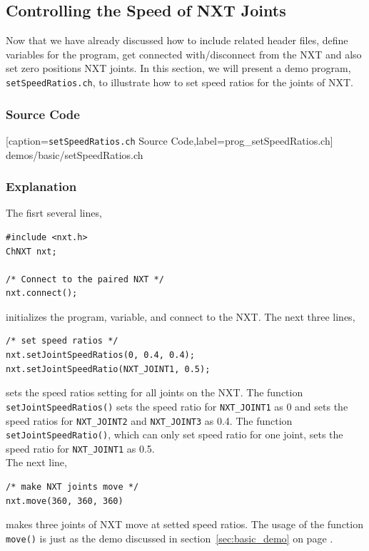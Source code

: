 \documentclass[11pt]{article}
\begin{document}
\subsection{\label{sec:speed_demo}Controlling the Speed of NXT Joints}
Now that we have already discussed how to include related header files, define variables for the program, 
get connected with/disconnect from the NXT and also set zero positions NXT joints. In this section, we will 
present a demo program, {\tt setSpeedRatios.ch}, to illustrate how to set speed ratios for the joints of NXT.

\subsubsection*{Source Code}

    [caption={{\tt setSpeedRatios.ch} Source Code},label=prog_setSpeedRatios.ch]
    {demos/basic/setSpeedRatios.ch}

\subsubsection*{Explanation}
The fisrt several lines,
\begin{lstlisting}
#include <nxt.h>
ChNXT nxt;

/* Connect to the paired NXT */
nxt.connect();
\end{lstlisting}
initializes the program, variable, and connect to the NXT. The next three lines,
\begin{lstlisting}
/* set speed ratios */
nxt.setJointSpeedRatios(0, 0.4, 0.4);
nxt.setJointSpeedRatio(NXT_JOINT1, 0.5);
\end{lstlisting}
sets the speed ratios setting for all joints on the NXT. The function {\tt setJointSpeedRatios()} sets 
the speed ratio for {\tt NXT\_JOINT1} as 0 and sets the speed ratios for {\tt NXT\_JOINT2} and 
{\tt NXT\_JOINT3} as 0.4. The function {\tt setJointSpeedRatio()}, which can only set speed ratio
for one joint, sets the speed ratio for {\tt NXT\_JOINT1} as 0.5.\\

The next line,
\begin{lstlisting}
/* make NXT joints move */
nxt.move(360, 360, 360)
\end{lstlisting}
makes three joints of NXT move at setted speed ratios. The usage of the function {\tt move()} is just 
as the demo discussed in section~\ref{sec:basic_demo} on page \pageref{sec:basic_demo}.

\end{document}
